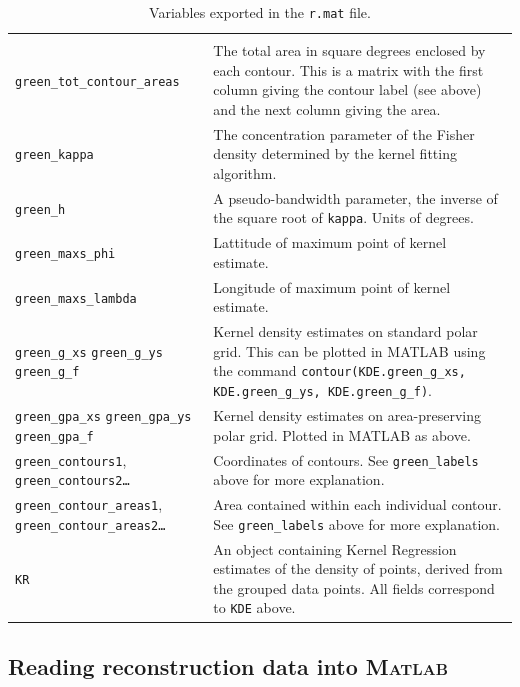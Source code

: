 \documentclass{article}
\begin{document}
\begin{table}[p]
\begin{tabularx}{\linewidth}{p{1.2in}X}
\begin{tabular}{p{1.5in}p{3in}}
      so on. \\
      \texttt{green\_tot\_contour\_areas} & The total area in square
      degrees enclosed by each contour. This is a matrix with the
      first column giving the contour label (see above) and the
      next column giving the area. \\
      \texttt{green\_kappa} & The concentration parameter of
      the Fisher density determined by the kernel fitting algorithm. \\
      \texttt{green\_h} & A pseudo-bandwidth parameter, the inverse
      of the square root of \texttt{kappa}. Units of degrees. \\
      \texttt{green\_maxs\_phi} & Lattitude of maximum point of kernel
      estimate. \\
      \texttt{green\_maxs\_lambda} & Longitude of maximum point of kernel
      estimate. \\
      \texttt{green\_g\_xs} \texttt{green\_g\_ys} \texttt{green\_g\_f}
      & Kernel density estimates on standard polar grid. This can be
      plotted in MATLAB using the command
      \texttt{contour(KDE.green\_g\_xs, KDE.green\_g\_ys,
        KDE.green\_g\_f)}. \\
      \texttt{green\_gpa\_xs} \texttt{green\_gpa\_ys}
      \texttt{green\_gpa\_f} & Kernel density estimates on
      area-preserving polar grid. Plotted in MATLAB as above. \\
      \texttt{green\_contours1}, \texttt{green\_contours2\dots} &
      Coordinates of contours. See \texttt{green\_labels} above for
      more explanation. \\
      \texttt{green\_contour\_areas1},
      \texttt{green\_contour\_areas2\dots} & Area contained within each
      individual contour. See \texttt{green\_labels} above for more
      explanation.
    \end{tabular} \\
    \texttt{KR} & An object containing Kernel Regression estimates of the
    density of points, derived from the grouped data points. All
    fields correspond to \texttt{KDE} above.\\
    \hline
  \end{tabularx}
  \caption{Variables exported in the \texttt{r.mat} file.}
  \label{tab:matlab-export}
\end{table}


\subsection{Reading reconstruction data into \textsc{Matlab}}
\label{retistruct-manual:sec:export-reconstr-data}
\end{document}
